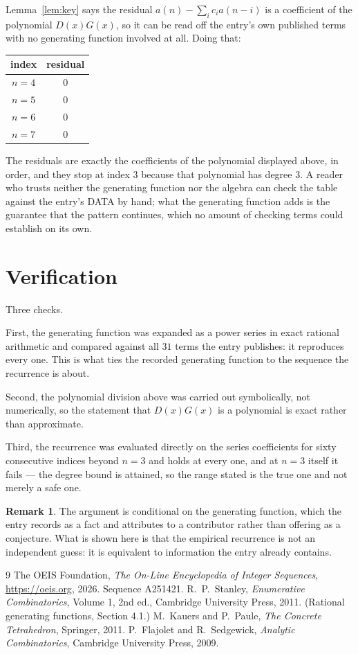 \documentclass[11pt,a4paper]{article}
\theoremstyle{plain}
\theoremstyle{definition}
\newtheorem{remark}[theorem]{Remark}
\begin{document}
Lemma~\ref{lem:key} says the residual $a(n)-\sum_ic_ia(n-i)$ is a coefficient of the
polynomial $D(x)G(x)$, so it can be read off the entry's own published terms with no
generating function involved at all. Doing that:
\begin{center}
\begin{tabular}{cc}
index & residual \\ \hline
$n=4$ & $0$ \\
$n=5$ & $0$ \\
$n=6$ & $0$ \\
$n=7$ & $0$
\end{tabular}
\end{center}
The residuals are exactly the coefficients of the polynomial displayed above, in order, and
they stop at index $3$ because that polynomial has degree $3$. A reader who trusts
neither the generating function nor the algebra can check the table against the entry's DATA
by hand; what the generating function adds is the guarantee that the pattern continues, which
no amount of checking terms could establish on its own.

\section{Verification}

Three checks.

First, the generating function was expanded as a power series in exact rational arithmetic and
compared against all $31$ terms the entry publishes: it reproduces every one. This is
what ties the recorded generating function to the sequence the recurrence is about.

Second, the polynomial division above was carried out symbolically, not numerically, so the
statement that $D(x)G(x)$ is a polynomial is exact rather than approximate.

Third, the recurrence was evaluated directly on the series coefficients for sixty consecutive
indices beyond $n=3$ and holds at every one, and at $n=3$ itself it fails --- the
degree bound is attained, so the range stated is the true one and not merely a safe one.

\begin{remark}
The argument is conditional on the generating function, which the entry records as a fact and
attributes to a contributor rather than offering as a conjecture. What is shown here is that
the empirical recurrence is not an independent guess: it is equivalent to information the
entry already contains.
\end{remark}

\begin{thebibliography}{9}
 The OEIS Foundation, \emph{The On-Line Encyclopedia of Integer
Sequences}, \url{https://oeis.org}, 2026. Sequence A251421.
 R.~P.~Stanley, \emph{Enumerative Combinatorics}, Volume 1, 2nd ed.,
Cambridge University Press, 2011. (Rational generating functions, Section 4.1.)
 M.~Kauers and P.~Paule, \emph{The Concrete Tetrahedron}, Springer, 2011.
 P.~Flajolet and R.~Sedgewick, \emph{Analytic Combinatorics}, Cambridge
University Press, 2009.
\end{thebibliography}
\end{document}
